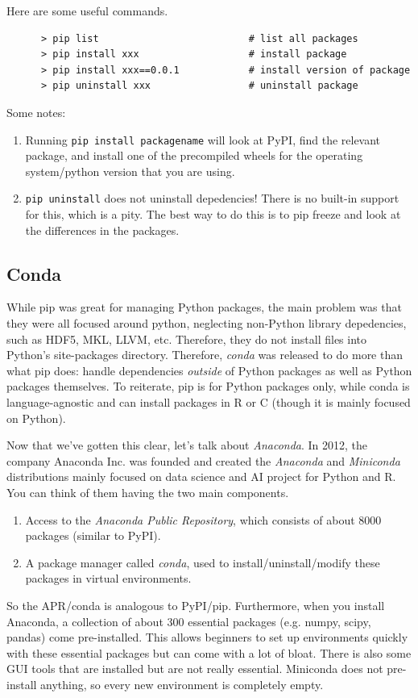   \begin{example}
    \label{ex:manage-packages-inside-venvs}
    Here are some useful commands. 
    \begin{lstlisting}
      > pip list                          # list all packages  
      > pip install xxx                   # install package
      > pip install xxx==0.0.1            # install version of package 
      > pip uninstall xxx                 # uninstall package
    \end{lstlisting} 
    Some notes: 
    \begin{enumerate}
      \item Running \texttt{pip install packagename} will look at PyPI, find the relevant package, and install one of the precompiled wheels for the operating system/python version that you are using.  
      \item \texttt{pip uninstall} does not uninstall depedencies! There is no built-in support for this, which is a pity. The best way to do this is to pip freeze and look at the differences in the packages. 
    \end{enumerate}
  \end{example}
  
\subsection{Conda}

  While pip was great for managing Python packages, the main problem was that they were all focused around python, neglecting non-Python library depedencies, such as HDF5, MKL, LLVM, etc. Therefore, they do not install files into Python's site-packages directory. Therefore, \textit{conda} was released to do more than what pip does: handle dependencies \textit{outside} of Python packages as well as Python packages themselves. To reiterate, pip is for Python packages only, while conda is language-agnostic and can install packages in R or C (though it is mainly focused on Python). 

  Now that we've gotten this clear, let's talk about \textit{Anaconda}. In 2012, the company Anaconda Inc. was founded and created the \textit{Anaconda} and \textit{Miniconda} distributions mainly focused on data science and AI project for Python and R. You can think of them having the two main components. 
  \begin{enumerate}
    \item Access to the \textit{Anaconda Public Repository}, which consists of about 8000 packages (similar to PyPI). 
    \item A package manager called \textit{conda}, used to install/uninstall/modify these packages in virtual environments. 
  \end{enumerate}
  So the APR/conda is analogous to PyPI/pip. Furthermore, when you install Anaconda, a collection of about 300 essential packages (e.g. numpy, scipy, pandas) come pre-installed. This allows beginners to set up environments quickly with these essential packages but can come with a lot of bloat. There is also some GUI tools that are installed but are not really essential. Miniconda does not pre-install anything, so every new environment is completely empty. 

